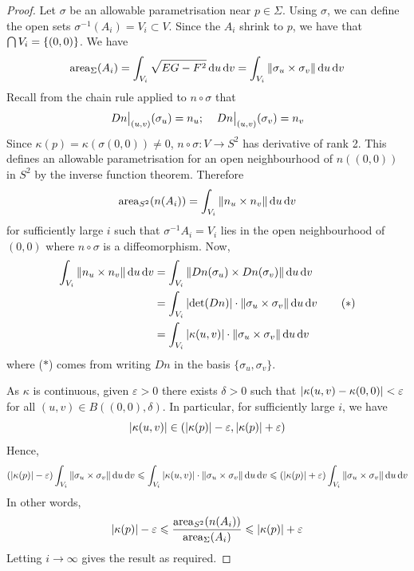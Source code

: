 \documentclass[a4paper]{article}
\begin{document}
\begin{proof}
	Let \( \sigma \) be an allowable parametrisation near \( p \in \Sigma \).
	Using \( \sigma \), we can define the open sets \( \sigma^{-1}(A_i) = V_i \subset V \).
	Since the \( A_i \) shrink to \( p \), we have that \( \bigcap V_i = \qty{(0,0)} \).
	We have
	\[
		\mathrm{area}_\Sigma(A_i) = \int_{V_i} \sqrt{EG - F^2} \dd{u} \dd{v} = \int_{V_i} \norm{\sigma_u \times \sigma_v} \dd{u}\dd{v}
	\]
	Recall from the chain rule applied to \( n \circ \sigma \) that
	\[
		\teval{Dn}{(u,v)}(\sigma_u) = n_u;\quad \teval{Dn}{(u,v)}(\sigma_v) = n_v
	\]
	Since \( \kappa(p) = \kappa(\sigma(0,0)) \neq 0 \), \( n \circ \sigma \colon V \to S^2 \) has derivative of rank 2.
	This defines an allowable parametrisation for an open neighbourhood of \( n((0,0)) \) in $ S^2 $ by the inverse function theorem. Therefore
	\[
		\mathrm{area}_{S^2}(n(A_i)) = \int_{V_i} \norm{n_u \times n_v} \dd{u} \dd{v}
	\]
	for sufficiently large \( i \) such that \( \sigma^{-1} A_i = V_i \) lies in the open neighbourhood of \( (0,0) \) where \( n \circ \sigma \) is a diffeomorphism. Now, 
	\begin{align*}
		\int_{V_i} \norm{n_u \times n_v} \dd{u} \dd{v} & = \int_{V_i} \norm{Dn(\sigma_u) \times Dn(\sigma_v)} \dd{u} \dd{v}                \\
		                                               & = \int_{V_i} \abs{\det (Dn)} \cdot \norm{\sigma_u \times \sigma_v} \dd{u} \dd{v} \tag{$*$} \\
		                                               & = \int_{V_i} \abs{\kappa(u,v)} \cdot \norm{\sigma_u \times \sigma_v} \dd{u}\dd{v}
	\end{align*}
	where ($*$) comes from writing $Dn$ in the basis $ \{\sigma_u,\sigma_v\} $. 

	As \( \kappa \) is continuous, given \( \varepsilon > 0 \) there exists \( \delta > 0 \) such that \( \abs{\kappa(u,v) - \kappa(0,0)} < \varepsilon \) for all \( (u,v) \in B((0,0), \delta) \).
	In particular, for sufficiently large \( i \), we have
	\[
		\abs{\kappa(u,v)} \in \qty(\abs{\kappa(p)}-\varepsilon, \abs{\kappa(p)}+\varepsilon)
	\]
	Hence,
	\[
		\qty(\abs{\kappa(p)}-\varepsilon) \int_{V_i} \norm{\sigma_u \times \sigma_v} \dd{u}\dd{v} \leqslant \int_{V_i} \abs{\kappa(u,v)} \cdot \norm{\sigma_u \times \sigma_v} \dd{u}\dd{v} \leqslant \qty(\abs{\kappa(p)}+\varepsilon) \int_{V_i} \norm{\sigma_u \times \sigma_v} \dd{u}\dd{v}
	\]
	In other words,
	\[
		\abs{\kappa(p)}-\varepsilon \leqslant \frac{\mathrm{area}_{S^2} (n(A_i))}{\mathrm{area}_{\Sigma} (A_i)} \leqslant \abs{\kappa(p)} + \varepsilon
	\]
	Letting \( i \to \infty \) gives the result as required.
\end{proof}
\end{document}
